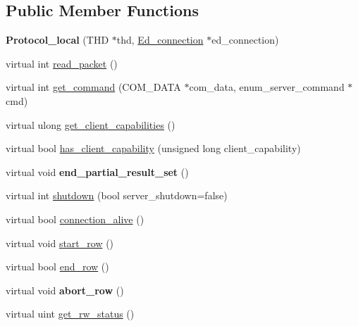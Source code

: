 \subsection*{Public Member Functions}
\begin{DoxyCompactItemize}
\item 
\mbox{\label{classProtocol__local_a51982d59e405d66131513843d43fe894}} 
{\bfseries Protocol\+\_\+local} (T\+HD $\ast$thd, \mbox{\hyperlink{classEd__connection}{Ed\+\_\+connection}} $\ast$ed\+\_\+connection)
\item 
virtual int \mbox{\hyperlink{classProtocol__local_a81ecc940d6b680cc855a5c34012686c6}{read\+\_\+packet}} ()
\item 
virtual int \mbox{\hyperlink{classProtocol__local_a35eec2045f7d376af31f3d473f8a5718}{get\+\_\+command}} (C\+O\+M\+\_\+\+D\+A\+TA $\ast$com\+\_\+data, enum\+\_\+server\+\_\+command $\ast$cmd)
\item 
virtual ulong \mbox{\hyperlink{classProtocol__local_a9b6d4b8d61490809b99080455b359189}{get\+\_\+client\+\_\+capabilities}} ()
\item 
virtual bool \mbox{\hyperlink{classProtocol__local_a896ec7f823e6040519d04952dc9f2fe3}{has\+\_\+client\+\_\+capability}} (unsigned long client\+\_\+capability)
\item 
\mbox{\label{classProtocol__local_a57b7a1727c2b33ba23436c00d602f033}} 
virtual void {\bfseries end\+\_\+partial\+\_\+result\+\_\+set} ()
\item 
virtual int \mbox{\hyperlink{classProtocol__local_a7f88c42439a65e26a2651d3ec4c64e0c}{shutdown}} (bool server\+\_\+shutdown=false)
\item 
virtual bool \mbox{\hyperlink{classProtocol__local_afdd93469cdacbec6cc7ac1a4379c7c40}{connection\+\_\+alive}} ()
\item 
virtual void \mbox{\hyperlink{classProtocol__local_a9cc8d72321e90ebed9432e01bac634b4}{start\+\_\+row}} ()
\item 
virtual bool \mbox{\hyperlink{classProtocol__local_a45337395c28d59b1f0aa1d95ab14eec5}{end\+\_\+row}} ()
\item 
\mbox{\label{classProtocol__local_a53104b29bd3274aedde9a2485e518d22}} 
virtual void {\bfseries abort\+\_\+row} ()
\item 
virtual uint \mbox{\hyperlink{classProtocol__local_a6699b46f137f58d32c7a0f934a221376}{get\+\_\+rw\+\_\+status}} ()

\end{DoxyCompactItemize}
